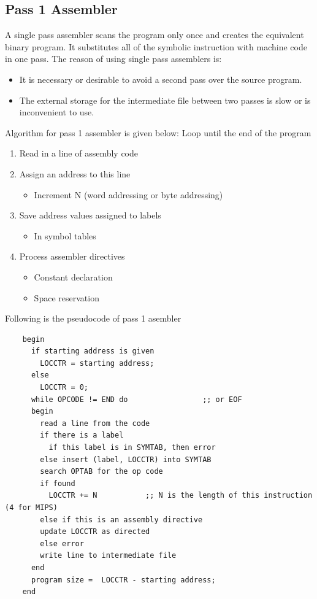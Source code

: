 \documentclass[a4paper,12pt]{extarticle}
\begin{document}
	\subsection{Pass 1 Assembler}
	A single pass assembler scans the program only once and creates the equivalent binary program. It substitutes all of the symbolic instruction with machine code in one pass. The reason of using single pass assemblers is:
	\begin{itemize}
		\item It is necessary or desirable to avoid a second pass over the source program.
		\item The external storage for the intermediate file between two passes is slow or is inconvenient to use.
	\end{itemize}
	Algorithm for pass 1 assembler is given below: \newline
	Loop until the end of the program
	\begin{enumerate}
		\item Read in a line of assembly code
		\item Assign an address to this line
		\begin{itemize}
			\item Increment N (word addressing or byte addressing)
		\end{itemize}
		\item Save address values assigned to labels
		\begin{itemize}
			\item In symbol tables
		\end{itemize}
		\item Process assembler directives
		\begin{itemize}
			\item Constant declaration
			\item Space reservation
		\end{itemize}
	\end{enumerate}
	Following is the pseudocode of pass 1 asembler
	\begin{verbatim}
	begin
	  if starting address is given
	    LOCCTR = starting address;
	  else
	    LOCCTR = 0;
	  while OPCODE != END do                 ;; or EOF
	  begin
	    read a line from the code
	    if there is a label
  	      if this label is in SYMTAB, then error
	    else insert (label, LOCCTR) into SYMTAB
	    search OPTAB for the op code
	    if found
	      LOCCTR += N           ;; N is the length of this instruction (4 for MIPS)
	    else if this is an assembly directive
	    update LOCCTR as directed
	    else error
	    write line to intermediate file
	  end
	  program size =  LOCCTR - starting address;
	end
	\end{verbatim}
\end{document}
